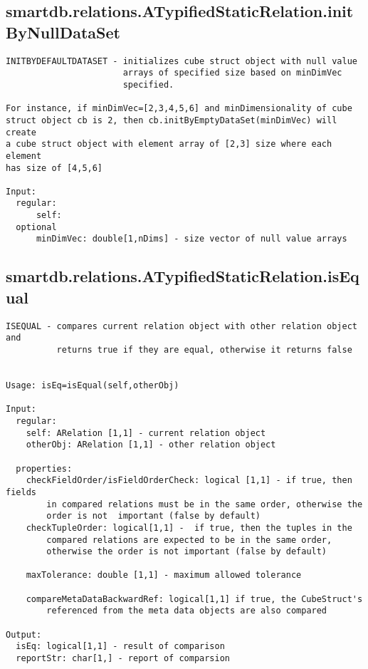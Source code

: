 \subsection{\texorpdfstring{smartdb.relations.ATypifiedStaticRelation.initByNullDataSet}{initByNullDataSet}}\label{method:smartdb.relations.ATypifiedStaticRelation.initByNullDataSet}
\begin{verbatim}
INITBYDEFAULTDATASET - initializes cube struct object with null value
                       arrays of specified size based on minDimVec
                       specified.

For instance, if minDimVec=[2,3,4,5,6] and minDimensionality of cube
struct object cb is 2, then cb.initByEmptyDataSet(minDimVec) will create
a cube struct object with element array of [2,3] size where each element
has size of [4,5,6]

Input:
  regular:
      self:
  optional
      minDimVec: double[1,nDims] - size vector of null value arrays
\end{verbatim}
\subsection{\texorpdfstring{smartdb.relations.ATypifiedStaticRelation.isEqual}{isEqual}}\label{method:smartdb.relations.ATypifiedStaticRelation.isEqual}
\begin{verbatim}
ISEQUAL - compares current relation object with other relation object and
          returns true if they are equal, otherwise it returns false


Usage: isEq=isEqual(self,otherObj)

Input:
  regular:
    self: ARelation [1,1] - current relation object
    otherObj: ARelation [1,1] - other relation object

  properties:
    checkFieldOrder/isFieldOrderCheck: logical [1,1] - if true, then fields
        in compared relations must be in the same order, otherwise the
        order is not  important (false by default)
    checkTupleOrder: logical[1,1] -  if true, then the tuples in the
        compared relations are expected to be in the same order,
        otherwise the order is not important (false by default)

    maxTolerance: double [1,1] - maximum allowed tolerance

    compareMetaDataBackwardRef: logical[1,1] if true, the CubeStruct's
        referenced from the meta data objects are also compared

Output:
  isEq: logical[1,1] - result of comparison
  reportStr: char[1,] - report of comparsion
\end{verbatim}
